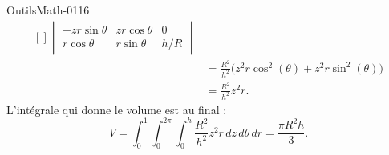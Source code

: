 \begin{corrige}{OutilsMath-0116}
\begin{equation}
\begin{aligned}[]
\begin{vmatrix}
                -zr\sin\theta    &   zr\cos\theta    &   0    \\
                r\cos\theta    &   r\sin\theta    &   h/R    
            \end{vmatrix}\\
            &=\frac{ R^2 }{ h^2 }\big( z^2r\cos^2(\theta)+z^2r\sin^2(\theta) \big)\\
            &=\frac{ R^2 }{ h^2 }z^2r.
        \end{aligned}
    \end{equation}
    L'intégrale qui donne le volume est au final :
    \begin{equation}
        V=\int_0^1\int_0^{2\pi}\int_0^h\frac{ R^2 }{ h^2 }z^2r\,dz\,d\theta\,dr=\frac{ \pi R^2h }{ 3 }.
    \end{equation}

\end{corrige}
